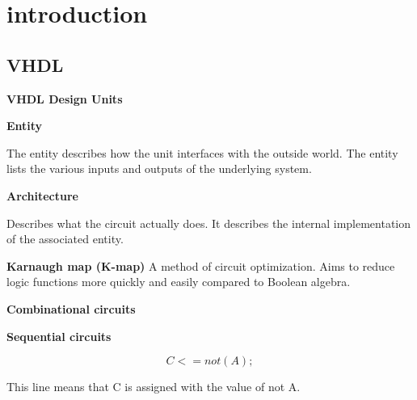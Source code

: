\section{introduction}

\subsection{VHDL}

\textbf{VHDL Design Units}


\textbf{Entity}

The entity describes how the unit interfaces with the outside world.
The entity lists the various inputs and outputs of the underlying system.

\textbf{Architecture}

Describes what the circuit actually does. It describes the internal
implementation of the associated entity.

\textbf{Karnaugh map (K-map)}
A method of circuit optimization. Aims to reduce logic functions
more quickly and easily compared to Boolean algebra.

\textbf{Combinational circuits}

\textbf{Sequential circuits}


$$C <= not(A);$$

This line means that C is assigned with the value of not A.

